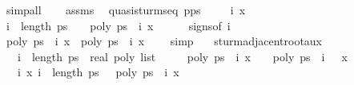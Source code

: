 \begin{isabellebody}
\ simp{\isacharunderscore}all\isanewline
{}\isamarkupfalse%
\isanewline
\ \ \isamarkupfalse%
\ assms{\isacharparenleft}{}{\isacharparenright}\ \isamarkupfalse%
\ quasi{\isacharunderscore}sturm{\isacharunderscore}seq\ {\isachardoublequoteopen}p{\isacharhash}ps{\isachardoublequoteclose}\ \isacommand{{\isachardot}}\isamarkupfalse%
\isanewline
\ \ \isamarkupfalse%
\ i\ x\isanewline
\ \ \isamarkupfalse%
\ {\isachardoublequoteopen}i\ {\isacharless}\ length\ ps\ {\isacharminus}\ {}{\isachardoublequoteclose}\ \ {\isachardoublequoteopen}poly\ {\isacharparenleft}ps\ {\isacharbang}\ {\isacharparenleft}i{\isacharplus}{}{\isacharparenright}{\isacharparenright}\ x\ {\isacharequal}\ {}{\isachardoublequoteclose}\isanewline
\ \ \isamarkupfalse%
\ signs{\isacharbrackleft}of\ {\isachardoublequoteopen}i{\isacharplus}{}{\isachardoublequoteclose}{\isacharbrackright}\ \isanewline
\ \ \ \ \ \ \isamarkupfalse%
\ {\isachardoublequoteopen}poly\ {\isacharparenleft}ps\ {\isacharbang}\ {\isacharparenleft}i{\isacharplus}{}{\isacharparenright}{\isacharparenright}\ x\ {\isacharasterisk}\ poly\ {\isacharparenleft}ps\ {\isacharbang}\ i{\isacharparenright}\ x\ {\isacharless}\ {}{\isachardoublequoteclose}\ \isamarkupfalse%
\ simp\isanewline
{}\isamarkupfalse%
%
\endisatagproof
{\isafoldproof}%
%
\isadelimproof
%
\endisadelimproof
%
\isamarkuptrue%
\isamarkupfalse%
\ {\isacharparenleft}\ {\isacharminus}{\isacharparenright}\ sturm{\isacharunderscore}adjacent{\isacharunderscore}root{\isacharunderscore}aux{\isacharcolon}\isanewline
\ \ \ {\isachardoublequoteopen}i\ {\isacharless}\ length\ {\isacharparenleft}ps\ {\isacharcolon}{\isacharcolon}\ real\ poly\ list{\isacharparenright}\ {\isacharminus}\ {}{\isachardoublequoteclose}\isanewline
\ \ \ {\isachardoublequoteopen}poly\ {\isacharparenleft}ps\ {\isacharbang}\ i{\isacharparenright}\ x\ {\isacharequal}\ {}{\isachardoublequoteclose}\ \ {\isachardoublequoteopen}poly\ {\isacharparenleft}ps\ {\isacharbang}\ {\isacharparenleft}i\ {\isacharplus}\ {}{\isacharparenright}{\isacharparenright}\ x\ {\isacharequal}\ {}{\isachardoublequoteclose}\isanewline
\ \ \ {\isachardoublequoteopen}{\isasymAnd}i\ x{\isachardot}\ {\isasymlbrakk}i\ {\isacharless}\ length\ ps\ {\isacharminus}\ {}{\isacharsemicolon}\ poly\ {\isacharparenleft}ps\ {\isacharbang}\ {\isacharparenleft}i{\isacharplus}{}{\isacharparenright}{\isacharparenright}\ x\ {\isacharequal}\ {}{\isasymrbrakk}\isanewline

\end{isabellebody}
